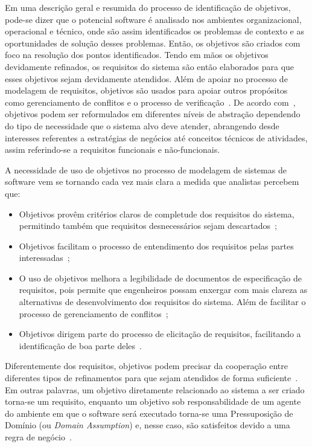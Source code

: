 Em uma descrição geral e resumida do processo de identificação de objetivos, pode-se dizer que o potencial software é analisado nos ambientes organizacional, operacional e técnico, onde são assim identificados os problemas de contexto e as oportunidades de solução desses problemas. Então, os objetivos são criados com foco na resolução dos pontos identificados. Tendo em mãos os objetivos devidamente refinados, os requisitos do sistema são então elaborados para que esses objetivos sejam devidamente atendidos. Além de apoiar no processo de modelagem de requisitos, objetivos são usados para apoiar outros propósitos como gerenciamento de conflitos e o processo de verificação~\cite{lapouchnian2005goal}. De acordo com~, objetivos podem ser reformulados em diferentes níveis de abstração dependendo do tipo de necessidade que o sistema alvo deve atender, abrangendo desde interesses referentes a estratégias de negócios até conceitos técnicos de atividades, assim referindo-se a requisitos funcionais e não-funcionais.

A necessidade de uso de objetivos no processo de modelagem de sistemas de software vem se tornando cada vez mais clara a medida que analistas percebem que:
\begin{itemize}
	\item Objetivos provêm critérios claros de completude dos requisitos do sistema, permitindo também que requisitos desnecessários sejam descartados~\cite{van2001goal};
	
	\item Objetivos facilitam o processo de entendimento dos requisitos pelas partes interessadas~\cite{van2001goal};
	
	\item O uso de objetivos melhora a legibilidade de documentos de especificação de requisitos, pois permite que engenheiros possam enxergar com mais clareza as alternativas de desenvolvimento dos requisitos do sistema. Além de facilitar o processo de gerenciamento de conflitos~\cite{van2001goal};
	
	\item Objetivos dirigem parte do processo de elicitação de requisitos, facilitando a identificação de boa parte deles~\cite{lapouchnian2005goal}.	
\end{itemize}

Diferentemente dos requisitos, objetivos podem precisar da cooperação entre diferentes tipos de refinamentos para que sejam atendidos de forma suficiente~\cite{dardenne1993goal}. Em outras palavras, um objetivo diretamente relacionado ao sistema a ser criado torna-se um requisito, enquanto um objetivo sob responsabilidade de um agente do ambiente em que o software será executado torna-se uma Pressuposição de Domínio (ou \textit{Domain Assumption}) e, nesse caso, são satisfeitos devido a uma regra de negócio~\cite{van2001goal, van1998managing}.

